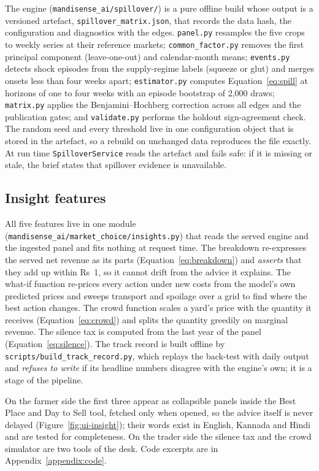 The engine (\texttt{mandisense\_ai/spillover/}) is a pure offline build whose output is a versioned artefact, \texttt{spillover\_matrix.json}, that records the data hash, the configuration and diagnostics with the edges. \texttt{panel.py} resamples the five crops to weekly series at their reference markets; \texttt{common\_factor.py} removes the first principal component (leave-one-out) and calendar-month means; \texttt{events.py} detects shock episodes from the supply-regime labels (squeeze or glut) and merges onsets less than four weeks apart; \texttt{estimator.py} computes Equation~\ref{eq:spill} at horizons of one to four weeks with an episode bootstrap of 2,000 draws; \texttt{matrix.py} applies the Benjamini--Hochberg correction across all edges and the publication gates; and \texttt{validate.py} performs the holdout sign-agreement check. The random seed and every threshold live in one configuration object that is stored in the artefact, so a rebuild on unchanged data reproduces the file exactly. At run time \texttt{SpilloverService} reads the artefact and fails safe: if it is missing or stale, the brief states that spillover evidence is unavailable.

\subsection{Insight features}

All five features live in one module (\texttt{mandisense\_ai/market\_choice/insights.py}) that reads the served engine and the ingested panel and fits nothing at request time. The breakdown re-expresses the served net revenue as its parts (Equation~\ref{eq:breakdown}) and \emph{asserts} that they add up within Rs~1, so it cannot drift from the advice it explains. The what-if function re-prices every action under new costs from the model's own predicted prices and sweeps transport and spoilage over a grid to find where the best action changes. The crowd function scales a yard's price with the quantity it receives (Equation~\ref{eq:crowd}) and splits the quantity greedily on marginal revenue. The silence tax is computed from the last year of the panel (Equation~\ref{eq:silence}). The track record is built offline by \texttt{scripts/build\_track\_record.py}, which replays the back-test with daily output and \emph{refuses to write} if its headline numbers disagree with the engine's own; it is a stage of the pipeline.

On the farmer side the first three appear as collapsible panels inside the Best Place and Day to Sell tool, fetched only when opened, so the advice itself is never delayed (Figure~\ref{fig:ui-insight}); their words exist in English, Kannada and Hindi and are tested for completeness. On the trader side the silence tax and the crowd simulator are two tools of the desk. Code excerpts are in Appendix~\ref{appendix:code}.

